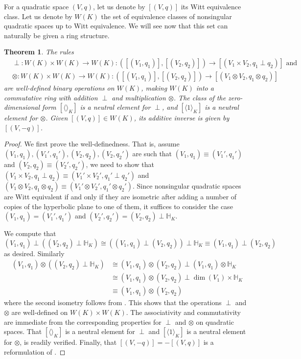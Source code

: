 \documentclass[12pt, leqno, british]{amsart}
\theoremstyle{definition}
\theoremstyle{plain}
\newtheorem{thm}[defi]{Theorem}
\theoremstyle{remark}
\newcommand{\mbb}{\mathbb}
\begin{document}
For a quadratic space $(V, q)$, let us denote by $[(V, q)]$ its Witt equivalence class.
Let us denote by $W(K)$ the set of equivalence classes of nonsingular quadratic spaces up to Witt equivalence.
We will see now that this set can naturally be given a ring structure.
\begin{thm}\label{T:WittRing}
The rules
\begin{align*}
&\perp : W(K) \times W(K) \to W(K) : ([(V_1, q_1)], [(V_2, q_2)]) \to [(V_1 \times V_2, q_1 \perp q_2)] \text{ and}\\
&\otimes : W(K) \times W(K) \to W(K) : ([(V_1, q_1)], [(V_2, q_2)]) \to [(V_1 \otimes V_2, q_1 \otimes q_2)]
\end{align*}
are well-defined binary operations on $W(K)$, making $W(K)$ into a commutative ring with addition $\perp$ and multiplication $\otimes$.
The class of the zero-dimensional form $[\langle \rangle_K]$ is a neutral element for $\perp$, and $[\langle 1 \rangle_K]$ is a neutral element for $\otimes$.
Given $[(V, q)] \in W(K)$, its additive inverse is given by $[(V, -q)]$.
\end{thm}
\begin{proof}
We first prove the well-definedness.
That is, assume $(V_1, q_1), (V_1', q_1'), (V_2, q_2), (V_2, q_2')$ are such that $(V_1, q_1) \equiv (V_1', q_1')$ and $(V_2, q_2) \equiv (V_2', q_2')$, we need to show that $(V_1 \times V_2, q_1 \perp q_2) \equiv (V_1' \times V_2', q_1' \perp q_2')$ and $(V_1 \otimes V_2, q_1 \otimes q_2) \equiv (V_1' \otimes V_2', q_1' \otimes q_2')$.
Since nonsingular quadratic spaces are Witt equivalent if and only if they are isometric after adding a number of copies of the hyperbolic plane to one of them, it suffices to consider the case $(V_1, q_1) = (V_1', q_1')$ and $(V_2', q_2') = (V_2, q_2) \perp \mbb{H}_K$.

We compute that
\begin{displaymath}
(V_1, q_1) \perp ((V_2, q_2) \perp \mbb{H}_K) \cong ((V_1, q_1) \perp (V_2, q_2)) \perp \mbb{H}_K \equiv (V_1, q_1) \perp (V_2, q_2)
\end{displaymath}
as desired.
Similarly
\begin{align*}
(V_1, q_1) \otimes ((V_2, q_2) \perp \mbb{H}_K) &\cong (V_1, q_1) \otimes (V_2, q_2) \perp (V_1, q_1) \otimes \mbb{H}_K \\
&\cong (V_1, q_1) \otimes (V_2, q_2) \perp \dim(V_1) \times \mbb{H}_K \\
&\equiv (V_1, q_1) \otimes (V_2, q_2)
\end{align*}
where the second isometry follows from .
This shows that the operations $\perp$ and $\otimes$ are well-defined on $W(K) \times W(K)$.
The associativity and commutativity are immediate from the corresponding properties for $\perp$ and $\otimes$ on quadratic spaces.
That $[\langle \rangle_K]$ is a neutral element for $\perp$ and $[\langle 1 \rangle_K]$ is a neutral element for $\otimes$, is readily verified.
Finally, that $[(V, -q)] = -[(V, q)]$ is a reformulation of .
\end{proof}
\end{document}
